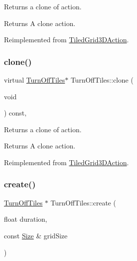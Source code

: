 Returns a clone of action.

\begin{DoxyReturn}{Returns}
A clone action. 
\end{DoxyReturn}


Reimplemented from \hyperlink{classTiledGrid3DAction_a689fd377cc0abae91db7def106529b53}{Tiled\+Grid3\+D\+Action}.

\mbox{\label{classTurnOffTiles_a270bb6ccc1a650fffa8c9165b4aba69a}} 
\subsubsection{\texorpdfstring{clone()}{clone()}\hspace{0.1cm}{\footnotesize\ttfamily [2/2]}}
{\footnotesize\ttfamily virtual \hyperlink{classTurnOffTiles}{Turn\+Off\+Tiles}$\ast$ Turn\+Off\+Tiles\+::clone (\begin{DoxyParamCaption}\item[{void}]{ }\end{DoxyParamCaption}) const\hspace{0.3cm}{\ttfamily [override]}, {\ttfamily [virtual]}}

Returns a clone of action.

\begin{DoxyReturn}{Returns}
A clone action. 
\end{DoxyReturn}


Reimplemented from \hyperlink{classTiledGrid3DAction_a689fd377cc0abae91db7def106529b53}{Tiled\+Grid3\+D\+Action}.

\mbox{\label{classTurnOffTiles_a8434139ca262b80d684868a154912801}} 
\subsubsection{\texorpdfstring{create()}{create()}\hspace{0.1cm}{\footnotesize\ttfamily [1/4]}}
{\footnotesize\ttfamily \hyperlink{classTurnOffTiles}{Turn\+Off\+Tiles} $\ast$ Turn\+Off\+Tiles\+::create (\begin{DoxyParamCaption}\item[{float}]{duration,  }\item[{const \hyperlink{classSize}{Size} \&}]{grid\+Size }\end{DoxyParamCaption})\hspace{0.3cm}{\ttfamily [static]}}



